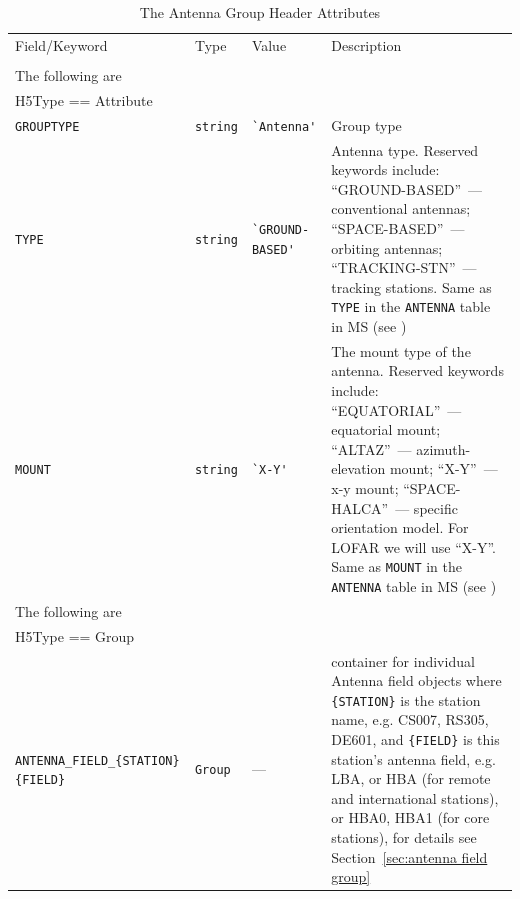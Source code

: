 \documentclass[a4paper,10pt,bibtotoc]{scrartcl}
\begin{document}
\begin{small}
\begin{table}[h]
\begin{small}
  \centering
  \begin{tabular}{|lllp{5.0cm}|}
    \hline
    \sc Field/Keyword  & \sc Type & \sc Value & Description \\
    \sc   & \sc & \sc & \\
    \hline \hline
    \sc The following are & \sc & \sc & \\
    \sc H5Type == Attribute & \sc & \sc & \\
    \hline
    \verb|GROUPTYPE|   & \verb|string| & \verb|`Antenna'| & Group type  \\
    \verb|TYPE|        & \verb|string| & \verb|`GROUND-BASED'| & Antenna type. Reserved keywords include: ``GROUND-BASED''~--- conventional antennas; ``SPACE-BASED''~--- orbiting antennas; ``TRACKING-STN''~--- tracking stations. Same as \verb|TYPE| in the \verb|ANTENNA| table in MS (see \cite{ms2.lofar.2018}) \\
    \verb|MOUNT|       & \verb|string| & \verb|`X-Y'| & The mount type of the antenna. Reserved keywords include: ``EQUATORIAL''~--- equatorial mount; ``ALTAZ''~--- azimuth-elevation mount; ``X-Y''~--- x-y mount; ``SPACE-HALCA''~--- specific orientation model. For LOFAR we will use ``X-Y''. Same as \verb|MOUNT| in the \verb|ANTENNA| table in MS (see \cite{ms2.lofar.2018}) \\
    \hline
    \sc The following are & \sc & \sc & \\
    \sc H5Type == Group & \sc & \sc & \\
    \hline
    \verb|ANTENNA_FIELD_{STATION}{FIELD}| & \verb|Group| & --- &  container for individual Antenna field objects where \verb|{STATION}| is the station name, e.g. CS007, RS305, DE601, and \verb|{FIELD}| is this station's antenna field, e.g. LBA, or HBA (for remote and international stations), or HBA0, HBA1 (for core stations), for details see Section~\ref{sec:antenna field group} \\
    \hline
  \end{tabular}
  \caption{The Antenna Group Header Attributes}
  \label{tab:antenna attributes}
\end{small}
\end{table}
\end{small}

\clearpage
\end{document}
